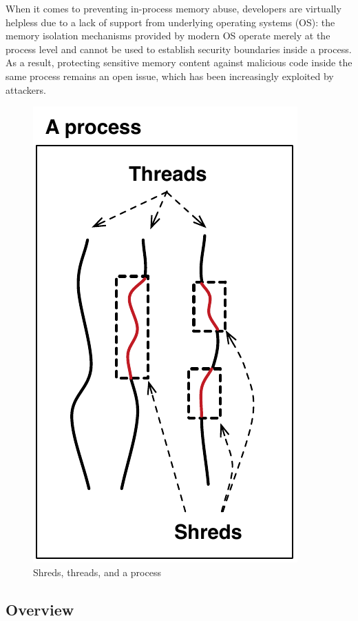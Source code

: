 When it comes to preventing in-process memory abuse, developers are virtually helpless due to a lack of support from underlying operating systems (OS): the memory isolation mechanisms provided by modern OS operate merely at the process level and cannot be used to establish security boundaries inside a process. As a result, protecting sensitive memory content against malicious code inside the same process remains an open issue, which has been increasingly exploited by attackers.

\begin{figure}[h]
\begin{center}
\includegraphics[scale=0.55]{shreds/figures/shreds}
\caption{Shreds, threads, and a process}
\label{fig:shred}
\end{center}
\end{figure}
\subsection{Overview}
\label{shreds:sec:overview}

